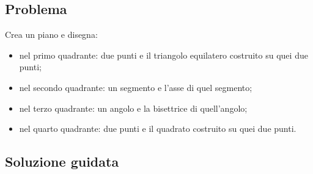 \subsection{Problema}

Crea un piano e disegna:
\begin{itemize} [noitemsep]
\item nel primo quadrante: 
 due punti e il triangolo equilatero costruito su quei due punti;
\item nel secondo quadrante: 
 un segmento e l'asse di quel segmento;
\item nel terzo quadrante: 
 un angolo e la bisettrice di quell'angolo;
\item nel quarto quadrante: 
 due punti e il quadrato costruito su quei due punti.
\end{itemize}

\subsection{Soluzione guidata}

